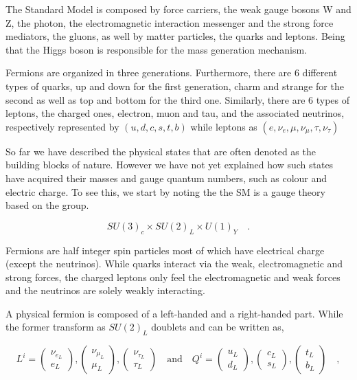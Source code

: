 { \color{red}
The Standard Model is composed by force carriers, the weak gauge bosons W and Z, the photon, the electromagnetic interaction messenger and the strong force mediators, the gluons, as well by matter particles, the quarks and leptons. Being that the Higgs boson is responsible for the mass generation mechanism.

Fermions are organized in three generations. Furthermore, there are 6 different types of quarks, up and down for the first generation, charm and strange for the second as well as top and bottom for the third one. Similarly, there are 6 types of leptons, the charged ones, electron, muon and tau, and the associated neutrinos, respectively represented by $(u,d,c,s,t,b)$ while leptons as $(e,\nu_{e},\mu,\nu_{\mu},\tau,\nu_{\tau})$

So far we have described the physical states that are often denoted as the building blocks of nature. However we have not yet explained how such states have acquired their masses and gauge quantum numbers, such as colour and electric charge. To see this, we start by noting the the SM is a gauge theory based on the group.

\begin{equation}
SU(3)_c \times SU(2)_L \times U(1)_Y \quad  .
\label{SMsymmetry}
\end{equation} 

Fermions are half integer spin particles most of which have electrical charge (except the neutrinos).  While quarks interact via the weak, electromagnetic and strong forces, the charged leptons only feel the electromagnetic and weak forces and the neutrinos are solely weakly interacting.  

A physical fermion is composed of a left-handed and a right-handed part. While the former transform as $SU(2)_L$ doublets and can be written as,

\begin{equation}
L^i= \begin{pmatrix}
\nu_{e_L} \\ e_L 
\end{pmatrix},
\begin{pmatrix}
\nu_{\mu_L} \\ \mu_L 
\end{pmatrix},
\begin{pmatrix}
\nu_{\tau_L} \\ \tau_L 
\end{pmatrix} 
\quad 
\text{and} \quad Q^i= \begin{pmatrix}
u_{L} \\
d_L 
\end{pmatrix},\begin{pmatrix}
c_{L} \\
s_L 
\end{pmatrix}
,\begin{pmatrix}
t_{L} \\
b_L 
\end{pmatrix} \quad ,
\end{equation}

}




